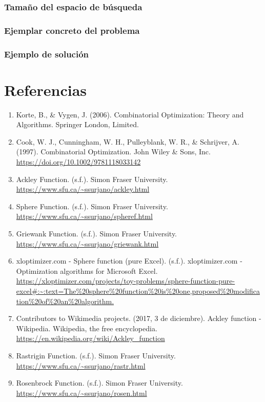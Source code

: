 \documentclass{article}
\begin{document}
\subsubsection*{Tamaño del espacio de búsqueda}

\subsubsection*{Ejemplar concreto del problema}

\subsubsection*{Ejemplo de solución}

\newpage
\section*{Referencias}
\begin{enumerate}
	\item Korte, B., \& Vygen, J. (2006). Combinatorial Optimization: Theory and Algorithms. Springer London, Limited.
	\item Cook, W. J., Cunningham, W. H., Pulleyblank, W. R., \& Schrijver, A. (1997). Combinatorial Optimization. John Wiley \& Sons, Inc. \url{https://doi.org/10.1002/9781118033142}
	\item Ackley Function. (s.f.). Simon Fraser University. \url{https://www.sfu.ca/~ssurjano/ackley.html}
	\item Sphere Function. (s.f.). Simon Fraser University. \url{https://www.sfu.ca/~ssurjano/spheref.html}
	\item Griewank Function. (s.f.). Simon Fraser University. \url{https://www.sfu.ca/~ssurjano/griewank.html}
	\item xloptimizer.com - Sphere function (pure Excel). (s.f.). xloptimizer.com - Optimization algorithms for Microsoft Excel. \url{https://xloptimizer.com/projects/toy-problems/sphere-function-pure-excel#:~:text=The%20sphere%20function%20is%20one,proposed%20modification%20of%20an%20algorithm.}
	\item Contributors to Wikimedia projects. (2017, 3 de diciembre). Ackley function - Wikipedia. Wikipedia, the free encyclopedia. \url{https://en.wikipedia.org/wiki/Ackley_function}
	\item Rastrigin Function. (s.f.). Simon Fraser University. \url{https://www.sfu.ca/~ssurjano/rastr.html}
	\item Rosenbrock Function. (s.f.). Simon Fraser University. \url{https://www.sfu.ca/~ssurjano/rosen.html}	
\end{enumerate}
\end{document}
